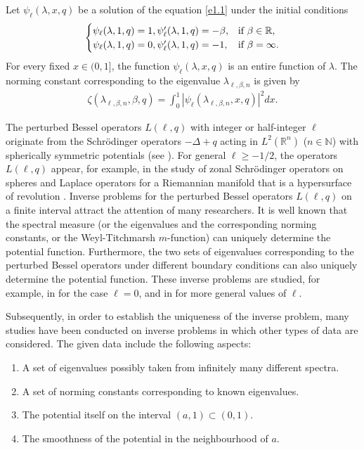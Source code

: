 \documentclass[reqno,12pt,centertags]{amsart}
\numberwithin{equation}{section}
\theoremstyle{definition}
\begin{document}
Let $\psi_{\ell}(\lambda, x, q)$ be a solution of the equation \eqref{e1.1} under the initial conditions
\begin{align}\label{e1.8}
\begin{cases}
\psi_{\ell}(\lambda, 1, q)=1, \psi_{\ell}^{\prime}(\lambda, 1, q)
=-\beta, 
&\textnormal{if}~\beta \in \mathbb{R}, \\
\psi_{\ell}(\lambda, 1, q)
=0, \psi_{\ell}^{\prime}(\lambda, 1, q)=-1, 
&\textnormal{if}~\beta=\infty.
\end{cases}
\end{align}
For every fixed $x\in(0,1]$, the function $\psi_{\ell}(\lambda, x, q)$ is an entire function of $\lambda$. 
The norming constant corresponding to the eigenvalue $\lambda_{\ell, \beta, n}$ is given by
\begin{align*}
\zeta(\lambda_{\ell, \beta, n},\beta, q)=\int_0^1|\psi_{\ell}(\lambda_{\ell, \beta, n}, x, q)|^{2}dx.
\end{align*}

The perturbed Bessel operators $L(\ell, q)$ with integer or half-integer $\ell$ originate from the Schr\"{o}dinger operators $-\Delta+q$ acting in $L^2(\mathbb{R}^n)$ ($n\in\mathbb{N}$) with spherically symmetric potentials (see \cite[p.286]{Wei1987}). For general $\ell\geq-1/2$, the operators $L(\ell, q)$ appear, for example, in the study of zonal Schr\"{o}dinger operators on spheres and Laplace operators for a Riemannian manifold that is a hypersurface of revolution \cite{ Carl1997}. Inverse problems for the perturbed Bessel operators $L(\ell, q)$ on a finite interval attract the attention of many researchers. It is well known that the spectral measure (or the eigenvalues and the corresponding norming constants, or the Weyl-Titchmarsh $m$-function) can uniquely determine the potential function. Furthermore, the two sets of eigenvalues corresponding to the perturbed Bessel operators under different boundary conditions can also uniquely determine the potential function. 
These inverse problems are studied, for example, in \cite{Borg1946,Guli2001,Levit1987,Marc1986,PT1987} for the case $\ell = 0$, and in \cite{SRYal2007, Carl1997,Eckh2014,Guli2005,Gasy1965,HS2010,KST2010,Ser2007,LAVS1994} for more general values of $\ell$.


Subsequently, in order to establish the uniqueness of the inverse problem, many studies have been conducted on inverse problems in which other types of data are considered. The given data include the following aspects:
\begin{enumerate}[label=\textnormal{(\arabic*).}]
\item A set of eigenvalues possibly taken from infinitely many different spectra.
\item A set of norming constants corresponding to known eigenvalues.
\item The potential itself on the interval $(a, 1) \subset(0, 1)$.
\item The smoothness of the potential in the neighbourhood of $a$.
\end{enumerate}
\end{document}

